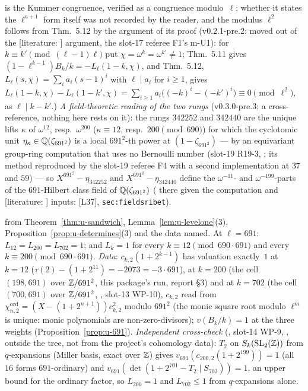 \documentclass[11pt]{article}
\newcommand{\LIT}[1]{\textsf{[literature: #1]}}   %
\begin{document}
\begin{proposition}[The two irregular classes at $\ell=691$]
{is the Kummer congruence, verified as a congruence modulo~$\ell$; whether it states the $\ell^{a+1}$ form itself was not recorded by the reader}, and the modulus
$\ell^{2}$ follows from Thm.~5.12 by the argument of its proof (v0.2.1-pre.2: moved out of the \LIT{} argument, the slot-17 referee F1's m-U1): for
$k\equiv k'\pmod{(\ell-1)\ell}$ put $\chi=\omega^{k}=\omega^{k'}\ne1$; Thm.~5.11 gives $(1-\ell^{k-1})B_k/k=-L_\ell(1-k,\chi)$, and Thm.~5.12,
$L_\ell(s,\chi)=\sum_ia_i(s-1)^{i}$ with $\ell\mid a_i$ for $i\ge1$, gives $L_\ell(1-k,\chi)-L_\ell(1-k',\chi)=\sum_{i\ge1}a_i\bigl((-k)^{i}-(-k')^{i}\bigr)\equiv0
\pmod{\ell^{2}}$, as $\ell\mid k-k'$.)
\emph{A field-theoretic reading of the two rungs} (v0.3.0-pre.3; a cross-reference, nothing here rests on it): the rungs $342252$ and $342440$ are the unique lifts
$\kappa$ of $\omega^{12}$, resp.\ $\omega^{200}$ ($\kappa\equiv12$, resp.\ $200\pmod{690}$) for which the cyclotomic unit $\eta_\kappa\in\mathbb{Q}(\zeta_{691^{2}})$ is a local
$691^{2}$-th power at $(1-\zeta_{691^{2}})$ --- \COMP{} by an equivariant group-ring computation that uses no Bernoulli number (slot-19 R19-3,
; its method reproduced by the slot-19 referee F4 with a second implementation at $37$ and $59$) --- so
$X^{691^{2}}-\eta_{342252}$ and $X^{691^{2}}-\eta_{342440}$ define the $\omega^{-11}$- and $\omega^{-199}$-parts of the $691$-Hilbert class field of $\mathbb{Q}(\zeta_{691^{2}})$
(\PROVED{} there given the computation and \LIT{} inputs: [L37], \texttt{sec:fieldsribet}).
\end{proposition}

\begin{theorem}\label{thm:u-L691}
\PROVED{} from Theorem~\ref{thm:u-sandwich}, Lemma~\ref{lem:u-levelone}(3), Proposition~\ref{prop:u-determines}(3) and the \COMP{} data named.
At $\ell=691$: $L_{12}=L_{200}=L_{702}=1$; and $L_k=1$ for every $k\equiv12\pmod{690\cdot691}$ and every $k\equiv200\pmod{690\cdot691}$.
\emph{Data}: $c_{k,2}(1+2^{k-1})$ has valuation exactly~$1$ at $k=12$ ($\tau(2)-(1+2^{11})=-2073=-3\cdot691$), at $k=200$ (the cell $(198,691)$
over $\mathbb{Z}/691^{2}$, this package's run, report \S3) and at $k=702$ (the cell $(700,691)$ over $\mathbb{Z}/691^{2}$, ,
slot-13 WP-10), $c_{k,2}$ read from $\chi^{\mathrm{ord}}_{n,2}=(X-(1+2^{n+1}))c_{k,2}^{2}$ modulo $691^{2}$ (the monic square root modulo $\ell^{m}$ is unique:
monic polynomials are non-zero-divisors); $v(B_k/k)=1$ at the three weights (Proposition~\ref{prop:u-691}).
\emph{Independent cross-check} (\COMP, slot-14 WP-9, , outside the tree, not from the project's
cohomology data): $T_2$ on $S_k(\mathrm{SL}_2(\mathbb{Z}))$ from $q$-expansions (Miller basis, exact over $\mathbb{Z}$) gives $v_{691}(c_{200,2}(1+2^{199}))=1$ (all $16$ forms
$691$-ordinary) and $v_{691}(\det(1+2^{701}-T_2\mid S_{702}))=1$, an upper bound for the ordinary factor, so $L_{200}=1$ and $L_{702}\le1$ from
$q$-expansions alone.
\end{theorem}
\end{document}
